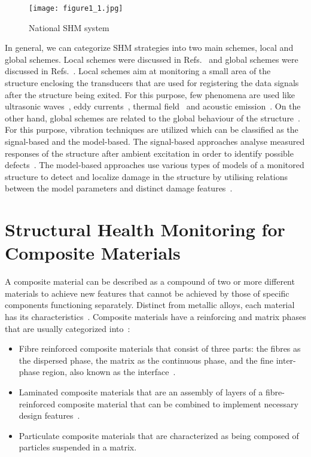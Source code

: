 \begin{figure} [h!]
	\begin{center}
	\texttt{[image: figure1\_1.jpg]}
	\end{center}
	
\caption{National SHM system~\cite{Yuan2016}}
 
	\label{fig:NationalSHM}
\end{figure}

In general, we can categorize SHM strategies into two main schemes, local and 
global schemes. Local schemes were discussed in Refs.~\cite{Grimberg2001,Maldague1993,Raghavan2007}
and global schemes were discussed in Refs.~\cite{Adams2002,Doebling1998,Uhl2004}. 
Local schemes aim at monitoring a small area of the structure enclosing the transducers that are used for registering the data signals after the structure being exited. 
For this purpose, few phenomena are used like ultrasonic waves~\cite{Raghavan2007}, eddy currents~\cite{Grimberg2001}, thermal field~\cite{Maldague1993} and acoustic emission~\cite{Pao1978}. 
On the other hand, global schemes are related to the global behaviour of the structure~\cite{Balageas2010}. 
For this purpose, vibration techniques are utilized which can be classified as the signal-based and the model-based.
The signal-based approaches analyse measured responses of the structure after 
ambient excitation in order to identify possible defects~\cite{Stepinski2013}. 
The model-based approaches use various types of models of a monitored structure 
to detect and localize damage in the structure by utilising relations 
between the model parameters and distinct damage features~\cite{Stepinski2013}. 


\section[SHM for Composite Materials]{Structural Health Monitoring for Composite Materials}
A composite material can be described as a compound of two or more different 
materials to achieve new features that cannot be achieved by those of specific 
components functioning separately.
Distinct from metallic alloys, each material has its characteristics~\cite{Campbell2010}.
Composite materials have a reinforcing and matrix phases that are usually categorized into~\cite{Jones1999}:

\begin{itemize}
	\item Fibre reinforced composite materials that consist of three parts: the 
	fibres as the dispersed phase, the matrix as the continuous phase, and the fine inter-phase region, also known as the interface~\cite{Cantwell1991}.
	\item Laminated composite materials that are an assembly of layers of a fibre-reinforced composite material that can be combined to implement 
	necessary design features~\cite{Ramirez1999}.
	\item Particulate composite materials that are characterized as being composed of particles suspended in a matrix.

\end{itemize}

